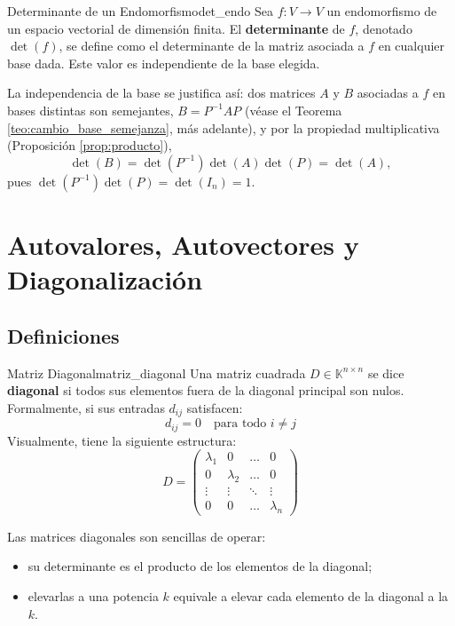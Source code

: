 \documentclass[11pt, a4paper]{article}
\begin{document}
\begin{definicion}{Determinante de un Endomorfismo}{det_endo}
Sea $f: V \to V$ un endomorfismo de un espacio vectorial de dimensión finita. El \textbf{determinante} de $f$, denotado $\det(f)$, se define como el determinante de la matriz asociada a $f$ en cualquier base dada. Este valor es independiente de la base elegida.
\end{definicion}

\obs La independencia de la base se justifica así: dos matrices $A$ y $B$ asociadas a $f$ en bases distintas son semejantes, $B = P^{-1} A P$ (véase el Teorema \ref{teo:cambio_base_semejanza}, más adelante), y por la propiedad multiplicativa (Proposición \ref{prop:producto}),
\[
\det(B) = \det(P^{-1}) \det(A) \det(P) = \det(A),
\]
pues $\det(P^{-1}) \det(P) = \det(I_n) = 1$.

\newpage

\section{Autovalores, Autovectores y Diagonalización}

\subsection{Definiciones}

\begin{definicion}{Matriz Diagonal}{matriz_diagonal}
Una matriz cuadrada $D \in \mathbb{K}^{n \times n}$ se dice \textbf{diagonal} si todos sus elementos fuera de la diagonal principal son nulos.
Formalmente, si sus entradas $d_{ij}$ satisfacen:
\[ d_{ij} = 0 \quad \text{para todo } i \neq j \]
Visualmente, tiene la siguiente estructura:
\[ D = \begin{pmatrix}
\lambda_1 & 0 & \dots & 0 \\
0 & \lambda_2 & \dots & 0 \\
\vdots & \vdots & \ddots & \vdots \\
0 & 0 & \dots & \lambda_n
\end{pmatrix} \]
\end{definicion}

\obs Las matrices diagonales son sencillas de operar:
\begin{itemize}
    \item su determinante es el producto de los elementos de la diagonal;
    \item elevarlas a una potencia $k$ equivale a elevar cada elemento de la diagonal a la $k$.
\end{itemize}
\end{document}
